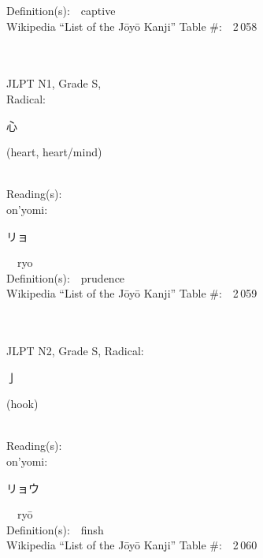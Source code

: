 \begin{multicols}{2}
Definition(s):\ \ captive \\
Wikipedia ``List of the J\=oy\=o Kanji'' Table \#:\ \ 2\,058 \\
\ \ \\
{\fontsize{34pt}{40pt}  }\ \ \\
{JLPT N1, Grade S, \\Radical:\ \ {\begin{CJK}{UTF8}{min} 心 \end{CJK}} (heart, heart/mind) } \\
Reading(s):\ \ \\
{\hspace*{1em}}on'yomi:\ \ \\
{\hspace*{2em}}{\begin{CJK}{UTF8}{min} リョ \end{CJK}}\ \ ryo\ \ \\
Definition(s):\ \ prudence \\
Wikipedia ``List of the J\=oy\=o Kanji'' Table \#:\ \ 2\,059 \\
\ \ \\
{\fontsize{34pt}{40pt}  }\ \ \\  %
{JLPT N2, Grade S, Radical:\ \ {\begin{CJK}{UTF8}{min} 亅 \end{CJK}} (hook) } \\
Reading(s):\ \ \\
{\hspace*{1em}}on'yomi:\ \ \\
{\hspace*{2em}}{\begin{CJK}{UTF8}{min} リョウ \end{CJK}}\ \ ry\=o\ \ \\
Definition(s):\ \ finsh \\
Wikipedia ``List of the J\=oy\=o Kanji'' Table \#:\ \ 2\,060 \\
\ \ \\
{\fontsize{34pt}{40pt}  }\ \ \\  %

\end{multicols}
